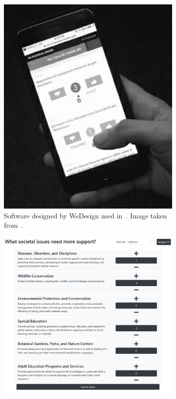 \begin{figure}[h]
    \centering
    \begin{subfigure}[b]{0.3\textwidth}
        \centering
        \includegraphics[width=\textwidth]{content/image/curr_interface/radical_market_wedesign.png}
        \caption{Software designed by WeDesign used in~\cite{quarfoot2017quadratic}. Image taken from~\cite{posner2018radical}.}
        \label{fig:wedesignInterface}
    \end{subfigure}
    \hfill
    \begin{subfigure}[b]{0.3\textwidth}
        \centering
        \includegraphics[width=\textwidth]{content/image/curr_interface/geek.sg_interface.png}

\end{subfigure}
\end{figure}
